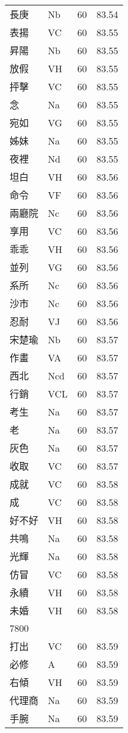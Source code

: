 \documentclass[twocolumn]{book}
\begin{document}
\begin{supertabular}{llrr}
長庚 & Nb & 60 &  83.54\\
表揚 & VC & 60 &  83.55\\
昇陽 & Nb & 60 &  83.55\\
放假 & VH & 60 &  83.55\\
抨擊 & VC & 60 &  83.55\\
念 & Na & 60 &  83.55\\
宛如 & VG & 60 &  83.55\\
姊妹 & Na & 60 &  83.55\\
夜裡 & Nd & 60 &  83.55\\
坦白 & VH & 60 &  83.56\\
命令 & VF & 60 &  83.56\\
兩廳院 & Nc & 60 &  83.56\\
享用 & VC & 60 &  83.56\\
乖乖 & VH & 60 &  83.56\\
並列 & VG & 60 &  83.56\\
系所 & Nc & 60 &  83.56\\
沙市 & Nc & 60 &  83.56\\
忍耐 & VJ & 60 &  83.56\\
宋楚瑜 & Nb & 60 &  83.57\\
作畫 & VA & 60 &  83.57\\
西北 & Ncd & 60 &  83.57\\
行銷 & VCL & 60 &  83.57\\
考生 & Na & 60 &  83.57\\
老 & Na & 60 &  83.57\\
灰色 & Na & 60 &  83.57\\
收取 & VC & 60 &  83.57\\
成就 & VC & 60 &  83.58\\
成 & VC & 60 &  83.58\\
好不好 & VH & 60 &  83.58\\
共鳴 & Na & 60 &  83.58\\
光輝 & Na & 60 &  83.58\\
仿冒 & VC & 60 &  83.58\\
永續 & VH & 60 &  83.58\\
未婚 & VH & 60 &  83.58\\
7800\\
打出 & VC & 60 &  83.59\\
必修 & A & 60 &  83.59\\
右傾 & VH & 60 &  83.59\\
代理商 & Na & 60 &  83.59\\
手腕 & Na & 60 &  83.59\\

\end{supertabular}
\end{document}

